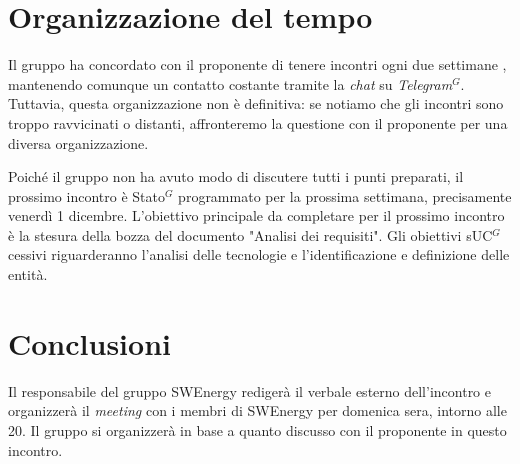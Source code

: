 \section{Organizzazione del tempo}

Il gruppo ha concordato con il proponente di tenere incontri ogni due settimane
, mantenendo comunque un contatto costante tramite la \textit{chat} su \textit{\gls{Telegram}$^G$}.
Tuttavia, questa organizzazione non è definitiva: se notiamo che gli incontri
sono troppo ravvicinati o distanti, affronteremo la questione con il
proponente per una diversa organizzazione.

Poiché il gruppo non ha avuto modo di discutere tutti i punti preparati, il
prossimo incontro è \gls{Stato}$^G$ programmato per la prossima settimana, precisamente
venerdì 1 dicembre. L'obiettivo principale da completare per il prossimo
incontro è la stesura della bozza del documento "Analisi dei requisiti". Gli
obiettivi s\gls{UC}$^G$cessivi riguarderanno l'analisi delle tecnologie e
l'identificazione e definizione delle entità.

\section{Conclusioni}

Il responsabile del gruppo SWEnergy redigerà il verbale esterno dell'incontro
e organizzerà il \textit{meeting} con i membri di SWEnergy per domenica sera,
intorno alle 20. Il gruppo si organizzerà in base a quanto discusso con il
proponente in questo incontro.
